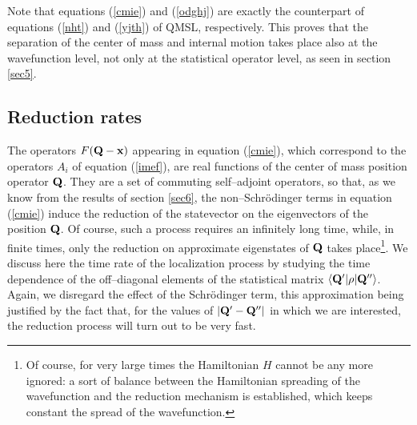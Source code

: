 \documentclass[10pt,a4paper]{article}
\begin{document}
Note that equations (\ref{cmie}) and (\ref{odghj}) are exactly the
counterpart of equations (\ref{nht}) and (\ref{yjth}) of QMSL,
respectively. This proves that the separation of the center of
mass and internal motion takes place also at the wavefunction
level, not only at the statistical operator level, as seen in
section \ref{sec5}.




\subsection{Reduction rates} \label{sec73}

The operators $F({\bf Q}-{\bf x})$ appearing in equation
(\ref{cmie}), which correspond to the operators $A_{i}$ of
equation (\ref{imef}), are real functions of the center  of mass
position operator ${\bf Q}$. They are a set of commuting
self--adjoint operators, so that, as we know from the results of
section \ref{sec6}, the non--Schr\"odinger terms in equation
(\ref{cmie}) induce the reduction of the statevector on the
eigenvectors of the position ${\bf Q}$. Of course, such a process
requires an infinitely long time, while, in finite times, only the
reduction on approximate eigenstates of ${\bf Q}$ takes
place\footnote{Of course, for very large times the Hamiltonian $H$
cannot be any more ignored: a sort of balance between the
Hamiltonian spreading of the wavefunction and the reduction
mechanism is established, which keeps constant the spread of the
wavefunction.}. We discuss here the time rate of the localization
process by studying the time dependence of the off--diagonal
elements of the statistical matrix $\langle {\bf Q}'| \rho |{\bf
Q}'' \rangle$. Again, we disregard the effect of the Schr\"odinger
term, this approximation being justified by the fact that, for the
values of $|{\bf Q}' - {\bf Q}''|$ in which we are interested, the
reduction process will turn out to be very fast.
\end{document}
